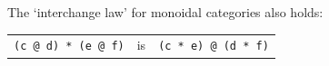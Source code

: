 \documentclass[leqno]{tufte-book} %
\makeatletter
\newtheorem{example}[theorem]{Example}
\newcommand\pythonstyle{\lstset{
language=Python,
basicstyle=\ttm,
otherkeywords={self,>>>},             %
keywordstyle=\ttb\small\color{deepblue},
emph={@,+\%%
literate={.+}{{{\color{red}.+}}}2 {.**}{{{\color{red}.\**{}}}}2 {*}{{{\color{red}*}}}1
},          %
emphstyle=\ttb\small\color{deepred},    %
stringstyle=\small\color{deepgreen},
frame=tb,                         %
showstringspaces=false            %
}}
\newcommand\pythoninline[1]{\pythonstyle\lstinline[basicstyle=\ttfamily\small]{#1}} %
\makeatother
\begin{document}
\noindent The `interchange law' for monoidal categories also holds:
\begin{center}
\begin{tabular}{ccc}
\mbox{\pythoninline{(c @ d) * (e @ f)}}
& \qquad\mbox{is}\qquad\quad &
\mbox{\pythoninline{(c * e) @ (d * f)}}
\end{tabular}
\end{center}








\end{document}
